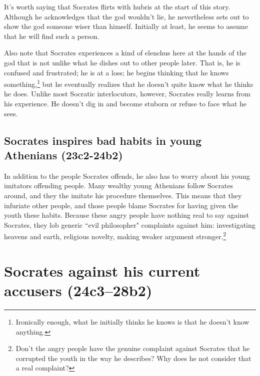 \documentclass[11pt]{article}
\begin{document}
It's worth saying that Socrates flirts with hubris at the start of this story.  Although he acknowledges that the god wouldn't lie, he nevertheless sets out to show the god someone wiser than himself.  Initially at least, he seems to assume that he will find such a person.

Also note that Socrates experiences a kind of elenchus here at the hands of the god that is not unlike what he dishes out to other people later. That is, he is confused and frustrated; he is at a loss; he begins thinking that he knows something,\footnote{Ironically enough, what he initially thinks he knows is that he doesn't know anything.} but he eventually realizes that he doesn't quite know what he thinks he does.  Unlike most Socratic interlocutors, however, Socrates really learns from his experience.  He doesn't dig in and become stuborn or refuse to face what he sees.

\subsection{Socrates inspires bad habits in young Athenians (23c2-24b2)}

In addition to the people Socrates offends, he also has to worry about his young imitators offending people.  Many wealthy young Athenians follow Socrates around, and they the imitate his procedure themselves. This means that they infuriate other people, and those people blame Socrates for having given the youth these habits.  Because these angry people have nothing real to say against Socrates, they lob generic ``evil philosopher" complaints against him: investigating heavens and earth, religious novelty, making weaker argument stronger.\footnote{Don't the angry people have the genuine complaint against Socrates that he corrupted the youth in the way he describes? Why does he not consider that a real complaint?}



\section{Socrates against his current accusers (24c3--28b2)}
\end{document}
